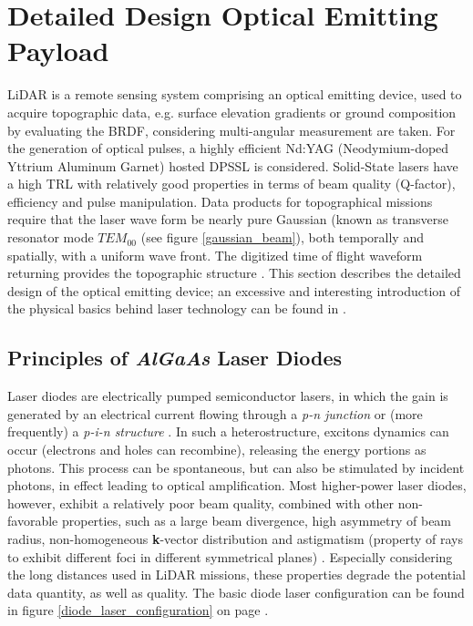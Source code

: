 \section{Detailed Design Optical Emitting Payload} 
\label{sec:DDlaser}
\acs{LiDAR} is a remote sensing system comprising an optical emitting device, used to acquire topographic data, e.g. surface elevation gradients or ground composition by evaluating the \acs{BRDF}, considering multi-angular measurement are taken. For the generation of optical pulses, a highly efficient Nd:YAG (Neodymium-doped Yttrium Aluminum Garnet) hosted \ac{DPSSL}  is considered. Solid-State \acp{laser} have a high \acs{TRL} with relatively good properties in terms of beam quality (Q-factor), efficiency and pulse manipulation. Data products for topographical missions require that the \ac{laser} wave form be nearly pure Gaussian (known as transverse resonator mode $TEM_{00}$ (see figure \ref{gaussian_beam}), both temporally and spatially, with a uniform wave front. The digitized time of flight waveform returning provides the topographic structure \cite{nd_yag_life}. This section describes the detailed design of the optical emitting device; an excessive and interesting introduction of the physical basics behind \acs{laser} technology can be found in \cite{laserfundamentals}. 

\subsection{Principles of \textit{AlGaAs} Laser Diodes}
\label{laser_diodes}
Laser diodes are electrically pumped semiconductor \acp{laser}, in which the gain is generated by an electrical current flowing through a \textit{p-n junction} or (more frequently) a \textit{p-i-n structure} \cite{lasertech}. In such a heterostructure, excitons dynamics can occur (electrons and holes can recombine), releasing the energy portions as photons. This process can be spontaneous, but can also be stimulated by incident photons, in effect leading to optical amplification. Most higher-power \acs{laser} diodes, however, exhibit a relatively poor beam quality, combined with other non-favorable properties, such as a large beam divergence, high asymmetry of beam radius, non-homogeneous \textbf{k}-vector distribution and astigmatism (property of rays to exhibit different foci in different symmetrical planes) \cite{lasertech}. Especially considering the long distances used in \acs{LiDAR} missions, these properties degrade the potential data quantity, as well as quality. The basic diode \acs{laser} configuration can be found in figure \ref{diode_laser_configuration} on page \pageref{diode_laser_configuration}.

